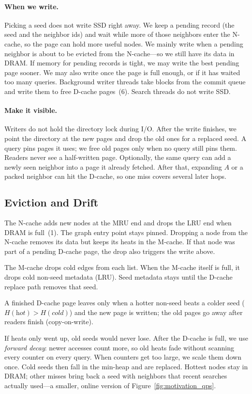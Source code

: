 \paragraph{When we write.}
Picking a seed does not write SSD right away.
We keep a pending record (the seed and the neighbor ids) and wait while more of those neighbors enter the N-cache, so the page can hold more useful nodes.
We mainly write when a pending neighbor is about to be evicted from the N-cache---so we still have its data in DRAM.
If memory for pending records is tight, we may write the best pending page sooner.
We may also write once the page is full enough, or if it has waited too many queries.
Background writer threads take blocks from the commit queue and write them to free D-cache pages~(6).
Search threads do not write SSD.

\paragraph{Make it visible.}
Writers do not hold the directory lock during I/O.
After the write finishes, we point the directory at the new pages and drop the old ones for a replaced seed.
A query pins pages it uses; we free old pages only when no query still pins them.
Readers never see a half-written page.
Optionally, the same query can add a newly seen neighbor into a page it already fetched.
After that, expanding $A$ or a packed neighbor can hit the D-cache, so one miss covers several later hops.

\subsection{Eviction and Drift}
\label{sec:design_evict}
The N-cache adds new nodes at the MRU end and drops the LRU end when DRAM is full~(1).
The graph entry point stays pinned.
Dropping a node from the N-cache removes its data but keeps its heats in the M-cache.
If that node was part of a pending D-cache page, the drop also triggers the write above.

The M-cache drops cold edges from each list.
When the M-cache itself is full, it drops cold non-seed metadata (LRU).
Seed metadata stays until the D-cache replace path removes that seed.

A finished D-cache page leaves only when a hotter non-seed beats a colder seed ($H(\textit{hot})>H(\textit{cold})$) and the new page is written; the old pages go away after readers finish (copy-on-write).

If heats only went up, old seeds would never lose.
After the D-cache is full, we use \emph{forward decay}: newer accesses count more, so old heats fade without scanning every counter on every query.
When counters get too large, we scale them down once.
Cold seeds then fall in the min-heap and are replaced.
Hottest nodes stay in DRAM; other misses bring back a seed with neighbors that recent searches actually used---a smaller, online version of Figure~\ref{fig:motivation_qps}.

